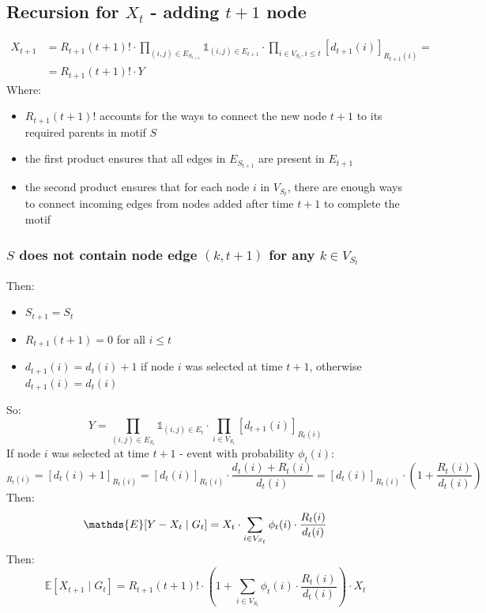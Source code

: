\documentclass{article}
\begin{document}
\newpage

\subsection*{Recursion for $X_t$ - adding $t+1$ node}
\begin{align}
    X_{t+1} &= R_{t+1}(t+1)! \cdot \prod_{(i,j) \in E_{S_{t+1}}} \mathds{1}_{(i,j) \in E_{t+1}} \cdot \prod_{i \in V_{S_t}, i \leq t} [d_{t+1}(i)]_{R_{t+1}(i)} = \\
            &= R_{t+1}(t+1)! \cdot Y
\end{align}
Where:
\begin{itemize}
    \item $R_{t+1}(t+1)!$ accounts for the ways to connect the new node $t+1$ to its required parents in motif $S$
    \item the first product ensures that all edges in $E_{S_{t+1}}$ are present in $E_{t+1}$
    \item the second product ensures that for each node $i$ in $V_{S_t}$, there are enough ways to connect incoming edges from nodes added after time $t+1$ to complete the motif
\end{itemize}

\subsubsection*{$S$ does not contain node edge ${(k, t+1)}$ for any $k \in V_{S_t}$}
Then:
\begin{itemize}
    \item $S_{t+1} = S_t$
    \item $R_{t+1}(t+1) = 0$ for all $i \leq t$
    \item $d_{t+1}(i) = d_t(i) + 1$ if node $i$ was selected at time $t+1$, otherwise $d_{t+1}(i) = d_t(i)$
\end{itemize}
So:
\begin{equation}
    Y   = \prod_{(i,j) \in E_{S_t}} \mathds{1}_{(i,j) \in E_{t}} \cdot \prod_{i \in V_{S_t}} [d_{t+1}(i)]_{R_t(i)}
\end{equation}
If node $i$ was selected at time $t+1$ - event with probability $\phi_t(i)$:
\begin{equation}
    [d_{t+1}(i)]_{R_t(i)} = [d_t(i) + 1]_{R_t(i)} = [d_t(i)]_{R_t(i)} \cdot \frac{d_t(i) + R_t(i)}{d_t(i)} = [d_t(i)]_{R_t(i)} \cdot \left(1 + \frac{R_t(i)}{d_t(i)}\right)
\end{equation}
Then:
\begin{equation}
    \mathds{E}[Y - X_t \mid G_t] = X_t \cdot \sum_{i \in V_{S_t}} \phi_t(i) \cdot \frac{R_t(i)}{d_t(i)} \\
\end{equation}
Then:
\begin{equation}
    \mathds{E}[X_{t+1} \mid G_t] = R_{t+1}(t+1)! \cdot \left(1 + \sum_{i \in V_{S_t}} \phi_t(i) \cdot \frac{R_t(i)}{d_t(i)}\right) \cdot X_t
\end{equation}
\newline
\end{document}
